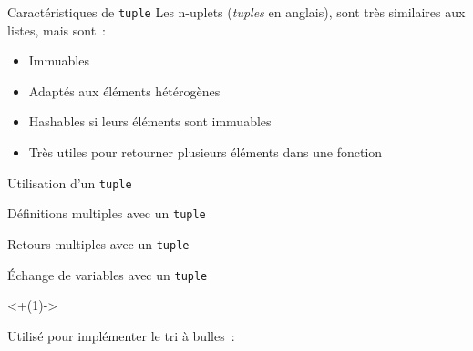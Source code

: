 \begin{frame}{Caractéristiques de \texttt{tuple}}
  Les n-uplets (\emph{tuples} en anglais), sont très similaires aux listes, mais sont~:

  \begin{itemize}[<+(1)->]
    \item Immuables
    \item Adaptés aux éléments hétérogènes
    \item Hashables si leurs éléments sont immuables
    \item Très utiles pour retourner plusieurs éléments dans une fonction
  \end{itemize}
\end{frame}

\begin{frame}{Utilisation d'un \texttt{tuple}}
\end{frame}

\begin{frame}{Définitions multiples avec un \texttt{tuple}}
\end{frame}

\begin{frame}{Retours multiples avec un \texttt{tuple}}
\end{frame}

\begin{frame}{Échange de variables avec un \texttt{tuple}}

  \onslide<+(1)->{
    Utilisé pour implémenter le tri à bulles~:

  }
\end{frame}
